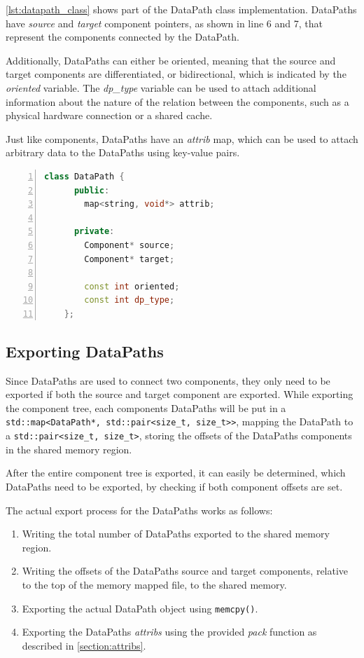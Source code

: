 \autoref{lst:datapath_class} shows part of the DataPath class implementation.
DataPaths have \emph{source} and \emph{target} component pointers, as shown in line 6 and 7, that represent the components connected by the DataPath.

Additionally, DataPaths can either be oriented, meaning that the source and target components are differentiated, or bidirectional, which is indicated by the \emph{oriented} variable.
The \emph{dp\_type} variable can be used to attach additional information about the nature of the relation between the components, such as a physical hardware connection or a shared cache.

Just like components, DataPaths have an \emph{attrib} map, which can be used to attach arbitrary data to the DataPaths using key-value pairs.

\begin{lstlisting}[language=c++, numbers=left, caption=DataPath Class, captionpos=b, label={lst:datapath_class}]
    class DataPath {
      public:
        map<string, void*> attrib;

      private:
        Component* source;
        Component* target;

        const int oriented;
        const int dp_type;
    };
\end{lstlisting}

\subsection{Exporting DataPaths}\label{subsection:export_dps}
Since DataPaths are used to connect two components, they only need to be exported if both the source and target component are exported.
While exporting the component tree, each components DataPaths will be put in a \lstinline|std::map<DataPath*, std::pair<size_t, size_t>>|,
mapping the DataPath to a \lstinline|std::pair<size_t, size_t>|, storing the offsets of the DataPaths components in the shared memory region.

After the entire component tree is exported, it can easily be determined, which DataPaths need to be exported, by checking if both component offsets are set.

The actual export process for the DataPaths works as follows:

\begin{enumerate}
    \item Writing the total number of DataPaths exported to the shared memory region.
    \item Writing the offsets of the DataPaths source and target components, relative to the top of the memory mapped file, to the shared memory.
    \item Exporting the actual DataPath object using \lstinline{memcpy()}.
    \item Exporting the DataPaths \emph{attribs} using the provided \emph{pack} function as described in \autoref{section:attribs}.
\end{enumerate}

